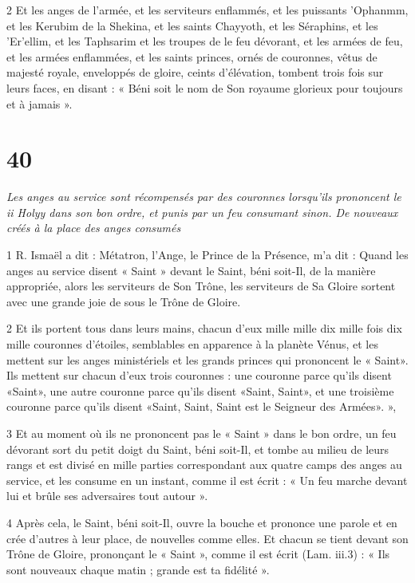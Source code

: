 \par 2 Et les anges de l'armée, et les serviteurs enflammés, et les puissants 'Ophanmm, et les Kerubim de la Shekina, et les saints Chayyoth, et les Séraphins, et les 'Er'ellim, et les Taphsarim et les troupes de le feu dévorant, et les armées de feu, et les armées enflammées, et les saints princes, ornés de couronnes, vêtus de majesté royale, enveloppés de gloire, ceints d'élévation, tombent trois fois sur leurs faces, en disant : « Béni soit le nom de Son royaume glorieux pour toujours et à jamais ».


\chapter{40}

\par \textit{Les anges au service sont récompensés par des couronnes lorsqu'ils prononcent le ii Holyy dans son bon ordre, et punis par un feu consumant sinon. De nouveaux créés à la place des anges consumés}

\par 1 R. Ismaël a dit : Métatron, l'Ange, le Prince de la Présence, m'a dit : Quand les anges au service disent « Saint » devant le Saint, béni soit-Il, de la manière appropriée, alors les serviteurs de Son Trône, les serviteurs de Sa Gloire sortent avec une grande joie de sous le Trône de Gloire.

\par 2 Et ils portent tous dans leurs mains, chacun d'eux mille mille dix mille fois dix mille couronnes d'étoiles, semblables en apparence à la planète Vénus, et les mettent sur les anges ministériels et les grands princes qui prononcent le « Saint». Ils mettent sur chacun d'eux trois couronnes : une couronne parce qu'ils disent «Saint», une autre couronne parce qu'ils disent «Saint, Saint», et une troisième couronne parce qu'ils disent «Saint, Saint, Saint est le Seigneur des Armées». »,

\par 3 Et au moment où ils ne prononcent pas le « Saint » dans le bon ordre, un feu dévorant sort du petit doigt du Saint, béni soit-Il, et tombe au milieu de leurs rangs et est divisé en mille parties correspondant aux quatre camps des anges au service, et les consume en un instant, comme il est écrit : « Un feu marche devant lui et brûle ses adversaires tout autour ».

\par 4 Après cela, le Saint, béni soit-Il, ouvre la bouche et prononce une parole et en crée d'autres à leur place, de nouvelles comme elles. Et chacun se tient devant son Trône de Gloire, prononçant le « Saint », comme il est écrit (Lam. iii.3) : « Ils sont nouveaux chaque matin ; grande est ta fidélité ».


